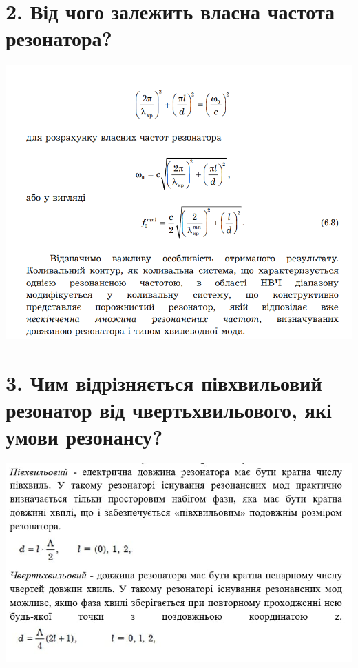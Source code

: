 \documentclass[a4paper,14pt]{extreport}
\begin{document}
\section{2. Від чого залежить власна частота резонатора?}
\includegraphics[scale=0.9]{7.png}\par
\section{3. Чим відрізняється півхвильовий резонатор від чвертьхвильового, які умови резонансу?}
\includegraphics[scale=0.9]{8.jpg}\par
\end{document}
